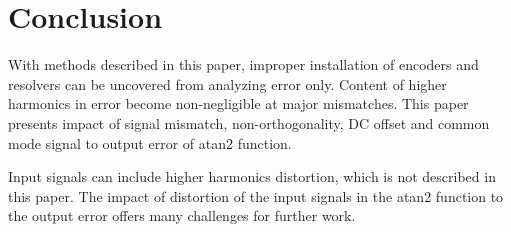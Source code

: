 \documentclass[a4paper]{article}
\begin{document}
\section{Conclusion}
With methods described in this paper, improper installation of encoders and resolvers can be uncovered from analyzing error only.
Content of higher harmonics in error become non-negligible at major mismatches. This paper presents impact of signal mismatch, non-orthogonality, DC offset and common mode signal to output error of atan2 function.

Input signals can include higher harmonics distortion, which is not described in this paper. The impact of distortion of the input signals in the atan2 function to the output error offers many challenges for further work. 
\small
\end{document}

